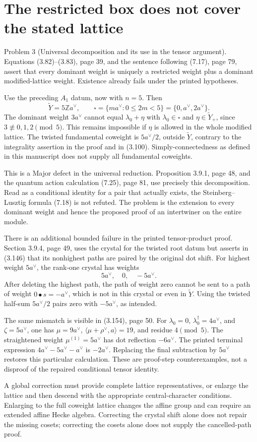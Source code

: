 \documentclass[10pt]{article}
\begin{document}
\section*{The restricted box does not cover the stated lattice}
Problem 3 (Universal decomposition and its use in the tensor argument).  Equations (3.82)–(3.83), page 39, and the sentence following (7.17), page 79, assert that every dominant weight is uniquely a restricted weight plus a dominant modified-lattice weight. Existence already fails under the printed hypotheses.\par
Use the preceding \(A_1\) datum, now with \(n=5\). Then \[\widetilde Y=5\mathbb Za^\vee,\qquad
 \square=\{ma^\vee:0\le2m<5\}=\{0,a^\vee,2a^\vee\}.\] The dominant weight \(3a^\vee\) cannot equal \(\lambda_0+\eta\) with \(\lambda_0\in\square\) and \(\eta\in\widetilde Y_+\), since \(3\not\equiv0,1,2\pmod5\). This remains impossible if \(\eta\) is allowed in the whole modified lattice. The twisted fundamental coweight is \(5a^\vee/2\), outside \(\widetilde Y\), contrary to the integrality assertion in the proof and in (3.100). Simply-connectedness as defined in this manuscript does not supply all fundamental coweights.\par
This is a Major defect in the universal reduction. Proposition 3.9.1, page 48, and the quantum action calculation (7.25), page 81, use precisely this decomposition. Read as a conditional identity for a pair that actually exists, the Steinberg–Lusztig formula (7.18) is not refuted. The problem is the extension to every dominant weight and hence the proposed proof of an intertwiner on the entire module.\par
There is an additional bounded failure in the printed tensor-product proof. Section 3.9.4, page 49, uses the crystal for the twisted root datum but asserts in (3.146) that its nonhighest paths are paired by the original dot shift. For highest weight \(5a^\vee\), the rank-one crystal has weights \[5a^\vee,\quad0,\quad-5a^\vee.\] After deleting the highest path, the path of weight zero cannot be sent to a path of weight \(0\mathbin{\bullet}s=-a^\vee\), which is not in this crystal or even in \(\widetilde Y\). Using the twisted half-sum \(5a^\vee/2\) pairs zero with \(-5a^\vee\), as intended.\par
The same mismatch is visible in (3.154), page 50. For \(\lambda_0=0\), \(\lambda_0^\dagger=4a^\vee\), and \(\zeta=5a^\vee\), one has \(\mu=9a^\vee\), \(\langle\mu+\rho^\vee,a\rangle=19\), and residue \(4\pmod5\). The straightened weight \(\mu^{(1)}=5a^\vee\) has dot reflection \(-6a^\vee\). The printed terminal expression \(4a^\vee-5a^\vee-a^\vee\) is \(-2a^\vee\). Replacing the final subtraction by \(5a^\vee\) restores this particular calculation. These are proof-step counterexamples, not a disproof of the repaired conditional tensor identity.\par
A global correction must provide complete lattice representatives, or enlarge the lattice and then descend with the appropriate central-character conditions. Enlarging to the full coweight lattice changes the affine group and can require an extended affine Hecke algebra. Correcting the crystal shift alone does not repair the missing cosets; correcting the cosets alone does not supply the cancelled-path proof.\par
\end{document}
